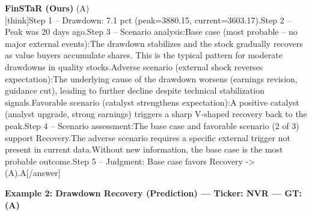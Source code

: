 \begin{minipage}[t]{0.41\textwidth}
\colorbox{green!10}{\parbox{\dimexpr\textwidth-2\fboxsep}{
\textbf{FinSTaR (Ours)} \textcolor{green!50!black}{(A)} \\[2pt]
\tiny
[think]\newline Step 1 -- Drawdown: 7.1 pct (peak=3880.15, current=3603.17).\newline Step 2 -- Peak was 20 days ago.\newline Step 3 -- Scenario analysis:\newline   Base case (most probable -- no major external events):\newline     The drawdown stabilizes and the stock gradually recovers as value buyers accumulate shares. This is the typical pattern for moderate drawdowns in quality stocks.\newline   Adverse scenario (external shock reverses expectation):\newline     The underlying cause of the drawdown worsens (earnings revision, guidance cut), leading to further decline despite technical stabilization signals.\newline   Favorable scenario (catalyst strengthens expectation):\newline     A positive catalyst (analyst upgrade, strong earnings) triggers a sharp V-shaped recovery back to the peak.\newline Step 4 -- Scenario assessment:\newline   The base case and favorable scenario (2 of 3) support Recovery.\newline   The adverse scenario requires a specific external trigger not present in current data.\newline   Without new information, the base case is the most probable outcome.\newline Step 5 -- Judgment: Base case favors Recovery -> (A).\newline [/think]\newline [answer]A[/answer]
}}
\end{minipage}
\vspace{8pt}


\noindent
\textbf{Example 2: Drawdown Recovery (Prediction) --- Ticker: NVR --- GT: (A)}
\vspace{2pt}

